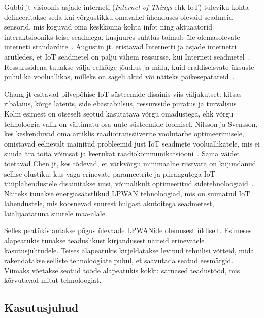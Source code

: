 \documentclass[12pt]{article}
\begin{document}
    Gubbi jt visioonis asjade interneti (\textit{Internet of Things} ehk IoT) tuleviku kohta defineeritakse seda kui võrgustikku omavahel ühenduses olevaid seadmeid — sensorid, mis koguvad oma keskkonna kohta infot ning aktuaatorid interaktsiooniks teise seadmega, kusjuures suhtlus toimub üle olemasolevate interneti standardite~\cite{gubbi2013internet}.
    Augustin jt. eristavad Internetti ja asjade internetti arutledes, et IoT seadmetel on palju vähem ressursse, kui Interneti seadmetel~\cite{augustin2016study}.
    Ressurssidena tuuakse välja eelkõige jõudlus ja mälu, kuid eraldiseisvate üksuste puhul ka vooluallikas, milleks on sageli akud või näiteks päikesepatareid~\cite{mabon2019smaller}.

    Chang jt esitavad pilvepõhise IoT süsteemide disainis viis väljakutset: kitsas ribalaius, kõrge latents, side ebastabiilsus, ressursside piiratus ja turvalisus~\cite{chang2019internet}.
    Kolm esimest on otseselt seotud kasutatava võrgu omadustega, ehk võrgu tehnoloogia valik on vältimatu osa uute süsteemide loomisel.
    Nilsson ja Svensson, kes keskenduvad oma artiklis raadiotranssiiverite voolutarbe optimeerimisele, omistavad eelnevalt mainitud probleemid just IoT seadmete vooluallikatele, mis ei suuda ära toita võimsat ja keerukat raadiokommunikatsiooni~\cite{nilsson2014power}.
    Sama väidet toetavad Chen jt, kes tõdevad, et värkvõrgu minimaalne riistvara on kujundanud sellise olustiku, kus väga erinevate parameetrite ja piirangutega IoT tüüplahendustele disainitakse uusi, võimalikult optimeeritud sidetehnoloogiaid~\cite{chen2018cognitive}.
    Näiteks tuuakse energiasäästlikud LPWAN tehnoloogiad, mis on suunatud IoT lahendustele, mis koosnevad suurest hulgast akutoitega seadmetest, laialijaotatuna suurele maa-alale.

    Selles peatükis antakse põgus ülevaade LPWANide olemusest üldiselt.
    Esimeses alapeatükis tuuakse teaduslikust kirjandusest näiteid erinevatele kasutusjuhtudele.
    Teises alapeatükis kirjeldatakse levinud tehnilisi võtteid, mida rakendatakse selliste tehnoloogiate puhul, et saavutada seatud eesmärgid.
    Viimaks võetakse seotud tööde alapeatükis kokku sarnased teadustööd, mis kõrvutavad mitut tehnoloogiat.

    \subsection{Kasutusjuhud}
\end{document}
